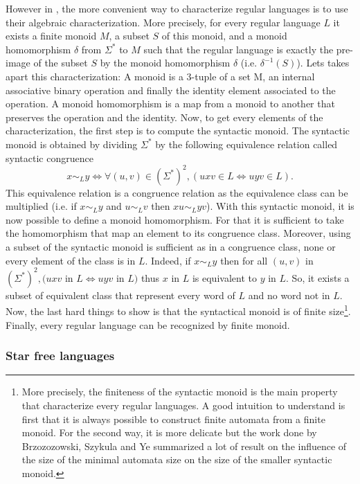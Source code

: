 However in \cite{trichotomy_not_andris}, the more convenient way to characterize
regular languages is to use their algebraic characterization. More precisely,
for every regular language $L$ it exists a finite monoid $M$, a subset $S$ of this monoid,
and a monoid homomorphism $\delta$ from $\Sigma^*$ to $M$ such that the regular language is exactly
the pre-image of the subset $S$ by the monoid homomorphism $\delta$ (i.e. $\delta^{-1}(S)$).
Lets takes apart this characterization: A monoid is a 3-tuple of a set M, an
internal associative binary operation and finally the identity element associated to the
operation. A monoid homomorphism is a map from a monoid to another that preserves the
operation and the identity. Now, to get every elements of the characterization, the first
step is to compute the syntactic monoid. The syntactic monoid is
obtained by dividing $\Sigma^*$ by the following equivalence relation called syntactic
congruence
\[x \sim_L y \Leftrightarrow \forall (u, v) \in \left(\Sigma^*\right)^2, (uxv \in L \Leftrightarrow uyv \in L).\]
This equivalence relation is a congruence relation as the equivalence class can be multiplied
(i.e. if $x\sim_L y$ and $u \sim_L v$ then $xu \sim_L yv$). With this syntactic monoid, it is
now possible to define a monoid homomorphism. For that it is sufficient to take the
homomorphism that map an element to its congruence class. Moreover, using a subset of the
syntactic monoid is sufficient as in a congruence class, none or every element of the class
is in $L$. Indeed, if $x \sim_L y$ then for all
$(u, v)$ in $\left(\Sigma^*\right)^2, (uxv$ in $L \Leftrightarrow uyv$ in $L)$ thus
$x$ in $L$ is equivalent to $y$ in $L$. So, it exists a subset of equivalent class that
represent every word of $L$ and no word not in $L$.
Now, the last hard things to show is that the syntactical monoid is of finite size\footnote{
    More precisely, the finiteness of the syntactic monoid is the main property that
    characterize every regular languages. A good intuition to understand is first that it
    is always possible to construct finite automata from a finite monoid. For the second way,
    it is more delicate but the work done by Brzozozowski, Szykula and Ye \cite[2018]{Brzozowski}
    summarized a lot of result on the influence of the size of the minimal automata size on
    the size of the smaller syntactic monoid.}.
Finally, every regular language can be recognized by finite monoid.

\subsubsection{Star free languages}\label{ssec:starfree}

